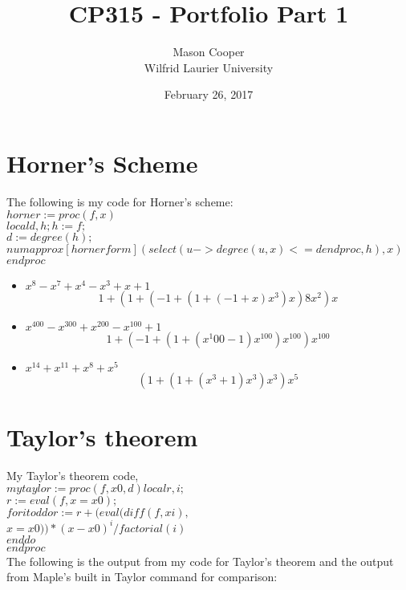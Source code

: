 \documentclass[12pt]{article}
\begin{document}
\title{CP315 - Portfolio Part 1}
\date{February 26, 2017}
\author{Mason Cooper\\ Wilfrid Laurier University}
\maketitle
\clearpage
\tableofcontents
\clearpage

\section{Horner's Scheme}
The following is my code for Horner's scheme:\\

$horner := proc (f, x)$\\
$local d, h; h := f;$\\
$d := degree(h);$\\
$numapprox[hornerform](select(u->degree(u, x) <= d end proc, h), x)$\\
$end proc$\\
\begin{itemize}
\item $x^8-x^7+x^4-x^3+x+1$
$$1+(1+(-1+(1+(-1+x)x^3)x)8x^2)x$$
\item $x^{400}-x^{300}+x^{200}-x^{100}+1$
$$1+(-1+(1+(x^1{00}-1)x^{100})x^{100})x^{100}$$
\item $x^14+x^11+x^8+x^5$
$$(1+(1+(x^3+1)x^3)x^3)x^5$$
\end{itemize}
\clearpage
\section{Taylor's theorem}
My Taylor's theorem code,\\

$mytaylor := proc (f, x0, d) local r, i;$\\
$r := eval(f, x = x0);$\\
$for i to d  do  r := r+(eval(diff(f, xi),$\\
$x = x0))*(x-x0)^i/factorial(i)$\\
$end do$\\
$end proc$\\

The following is the output from my code for Taylor's theorem and the output from Maple's built in Taylor command for comparison:\\
\end{document}
